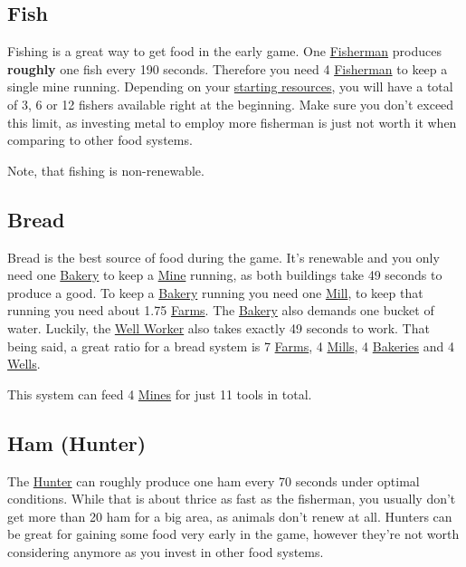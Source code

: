 \documentclass[12pt]{article}
\begin{document}
\subsection{Fish}
\label{sec:fish}

Fishing is a great way to get food in the early game. One \hyperref[sec:fisherman]{Fisherman} produces \textbf{roughly} one fish every 190 seconds. Therefore you need 4 \hyperref[sec:fisherman]{Fisherman} to keep a single mine running. Depending on your \hyperref[sec:startresources]{starting resources}, you will have a total of 3, 6 or 12 fishers available right at the beginning. Make sure you don't exceed this limit, as investing metal to employ more fisherman is just not worth it when comparing to other food systems.

Note, that fishing is non-renewable.

\subsection{Bread}
\label{sec:bread}

Bread is the best source of food during the game. It's renewable and you only need one \hyperref[sec:bakery]{Bakery} to keep a \hyperref[sec:mine]{Mine} running, as both buildings take 49 seconds to produce a good. To keep a \hyperref[sec:bakery]{Bakery} running you need one \hyperref[sec:mill]{Mill}, to keep that running you need about 1.75 \hyperref[sec:farm]{Farms}. The \hyperref[sec:bakery]{Bakery} also demands one bucket of water. Luckily, the \hyperref[sec:well]{Well Worker} also takes exactly 49 seconds to work. That being said, a great ratio for a bread system is 7 \hyperref[sec:farm]{Farms}, 4 \hyperref[sec:mill]{Mills}, 4 \hyperref[sec:bakery]{Bakeries} and 4 \hyperref[sec:well]{Wells}.

This system can feed 4 \hyperref[sec:mine]{Mines} for just 11 tools in total.

\subsection{Ham (Hunter)}
\label{sec:hamhunter}

The  \hyperref[sec:hunter]{Hunter} can roughly produce one ham every 70 seconds under optimal conditions. While that is about thrice as fast as the fisherman, you usually don't get more than 20 ham for a big area, as animals don't renew at all. Hunters can be great for gaining some food very early in the game, however they're not worth considering anymore as you invest in other food systems.
\end{document}
